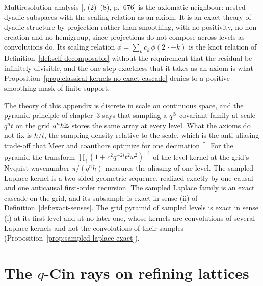Multiresolution analysis [, (2)--(8), p.~676] is the axiomatic neighbour:
nested dyadic subspaces with the scaling relation as an axiom. It is an exact theory of dyadic
structure by projection rather than smoothing, with no positivity, no non-creation and no
hemigroup, since projections do not compose across levels as convolutions do. Its scaling relation $\phi = \sum_kc_k\,\phi(2\,\cdot - k)$ is the
knot relation of Definition~\ref{def:self-decomposable} without the requirement that the residual
be infinitely divisible, and the one-step exactness that it takes as an axiom is what
Proposition~\ref{prop:classical-kernels-no-exact-cascade} denies to a positive smoothing mask of
finite support.

The theory of this appendix is discrete in scale on continuous space, and the pyramid principle of
chapter~3 says that sampling a $q^{\mathbb{Z}}$-covariant family at scale $q^nt$ on the grid $q^nh\mathbb{Z}$
stores the same array at every level. What the axioms do not fix is $h/t$, the sampling density
relative to the scale, which is the anti-aliasing trade-off that Meer and coauthors optimize for one
decimation []. For the \Matern{} pyramid the transform
$\prod_i(1 + c^2q^{-2i}t^2\omega^2)^{-1}$ of the level kernel at the grid's Nyquist wavenumber
$\pi/(q^nh)$ measures the aliasing of one level. The sampled Laplace kernel is a two-sided geometric
sequence, realized exactly by one causal and one anticausal first-order recursion. The sampled
Laplace family is an exact cascade on the grid, and its subsample is exact in sense (ii) of
Definition~\ref{def:exact-senses}. The grid pyramid of sampled \Matern{} levels is exact in sense (i)
at its first level and at no later one, whose kernels are convolutions of several Laplace kernels
and not the convolutions of their samples (Proposition~\ref{prop:sampled-laplace-exact}).

\section{The $q$-Cin rays on refining lattices}
\label{sec:line-random-walks}

